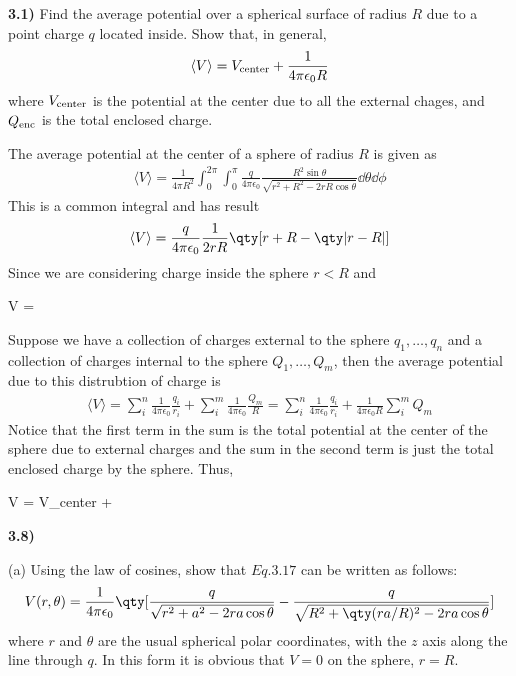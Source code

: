 \documentclass[12pt,a4paper]{article}
\newcommand{\prob}[2]{\textbf{#1)} #2}
\begin{document}
\prob{3.1}{Find the average potential over a spherical surface of radius $R$ due to a point charge $q$ located inside. Show that, in general, 
\[
\langle V \rangle = V_{\rm center} + \frac{1}{4\pi\epsilon_0R}
\]
where $V_{\rm center}$ is the potential at the center due to all the external chages, and $Q_{\rm enc}$ is the total enclosed charge.}

The average potential at the center of a sphere of radius $R$ is given as
\begin{align*}
\langle V \rangle = \frac{1}{4\pi R^2}\int_{0}^{2\pi}\int_{0}^{\pi} \frac{q}{4\pi\epsilon_0}\frac{R^2\sin{\theta}}{\sqrt{r^2 + R^2 - 2rR\cos{\theta}}}\dd{\theta}\dd{\phi}
\end{align*}
This is a common integral and has result
\begin{align*}
\langle V \rangle = \frac{q}{4\pi\epsilon_0}\frac{1}{2rR}\qty[r+R-\qty|r-R|]
\end{align*}
Since we are considering charge inside the sphere $r < R$ and
\begin{eqbox}
\langle V \rangle = 
\end{eqbox}

Suppose we have a collection of charges external to the sphere $q_1,\hdots,q_n$ and a collection of charges internal to the sphere $Q_1,\hdots,Q_m$, then the average potential due to this distrubtion of charge is 
\begin{align*}
\langle V \rangle = \sum_{i}^{n} \frac{1}{4\pi\epsilon_0}\frac{q_i}{r_i} + \sum_{i}^{m} \frac{1}{4\pi\epsilon_0}\frac{Q_m}{R} = \sum_{i}^{n} \frac{1}{4\pi\epsilon_0}\frac{q_i}{r_i} + \frac{1}{4\pi\epsilon_0 R}\sum_{i}^{m} Q_m
\end{align*}
Notice that the first term in the sum is the total potential at the center of the sphere due to external charges and the sum in the second term is just the total enclosed charge by the sphere. Thus, 
\begin{eqbox}
\langle V \rangle = V_{\rm center} + 
\end{eqbox}

\prob{3.8}{}

(a) Using the law of cosines, show that $Eq. 3.17$ can be written as follows:
\begin{align*}
V(r,\theta) = \frac{1}{4\pi\epsilon_0}\qty[\frac{q}{\sqrt{r^2+a^2-2ra\cos{\theta}}} - \frac{q}{\sqrt{R^2+\qty(ra/R)^2-2ra\cos{\theta}}}]
\end{align*}
where $r$ and $\theta$ are the usual spherical polar coordinates, with the $z$ axis along the line through $q$. In this form it is obvious that $V = 0$ on the sphere, $r = R$.
\end{document}
